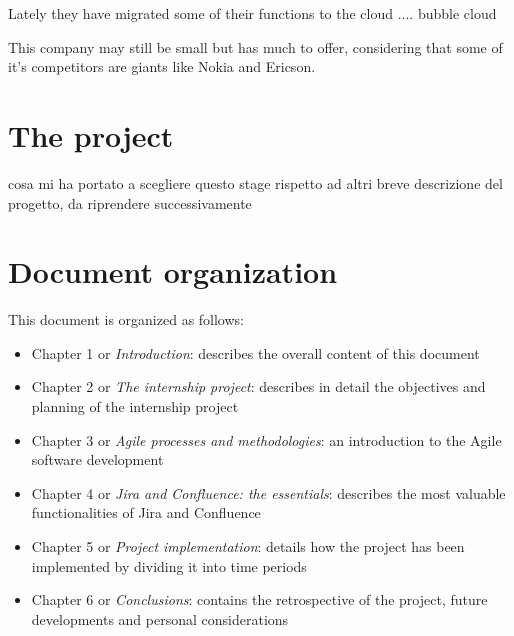	Lately they have migrated some of their functions to the cloud .... bubble cloud
	
	This company may still be small but has much to offer, considering that some of it's competitors are giants like Nokia and Ericson.
	

\section{The project}
	cosa mi ha portato a scegliere questo stage rispetto ad altri
	breve descrizione del progetto, da riprendere successivamente

\section{Document organization}
	This document is organized as follows:
	\begin{itemize}
		\item Chapter 1 or \textit{Introduction}: describes the overall content of this document
		\item Chapter 2 or \textit{The internship project}: describes in detail the objectives and planning of the internship project
		\item Chapter 3 or \textit{Agile processes and methodologies}: an introduction to the Agile software development
		\item Chapter 4 or \textit{Jira and Confluence: the essentials}: describes the most valuable functionalities of Jira and Confluence
		\item Chapter 5 or \textit{Project implementation}: details how the project has been implemented by dividing it into time periods
		\item Chapter 6 or \textit{Conclusions}: contains the retrospective of the project, future developments and personal considerations
	\end{itemize}
